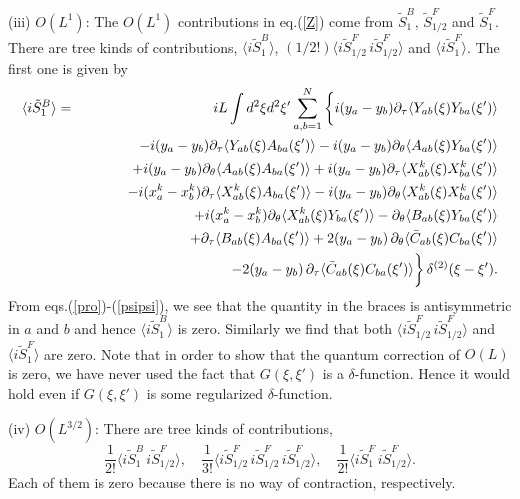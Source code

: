 \documentclass[a4paper,12pt]{article}
\newcommand{\nn}{\nonumber\\}
\newcommand{\ptau}{\partial_\tau}
\newcommand{\pth}{\partial_\theta}
\newcommand{\vev}[1]{\langle #1 \rangle}
\begin{document}
(iii) $O(L^{1})$:
The $O(L^{1})$ contributions in eq.(\ref{Z}) come from
$\tilde{S}_{1}^B$, $\tilde{S}_{1/2}^F$ and
$\tilde{S}_{1}^F$.
There are tree kinds of contributions,
$\vev{i\tilde{S}_{1}^B}$, $(1/2!) \vev{i\tilde{S}_{1/2}^F
\,i\tilde{S}_{1/2}^F}$ and $\vev{i\tilde{S}_{1}^F}$.
The first one is given by
\begin{eqnarray}
\vev{i\tilde{S}_{1}^B} &=&iL\int d^2 \xi d^2 \xi'
	 \sum_{a,b=1}^N\bigg\{i(y_a-y_b)\ptau
	\vev{Y_{ab}(\xi)Y_{ba}(\xi')}\nn
  &&\hspace{7ex}-i(y_a-y_b)\ptau\vev{Y_{ab}(\xi)A_{ba}(\xi')}
	-i(y_a-y_b)\pth\vev{A_{ab}(\xi)Y_{ba}(\xi')}\nn
  &&\hspace{7ex}+i(y_a-y_b)\pth\vev{A_{ab}(\xi)A_{ba}(\xi')}
	+i(y_a-y_b)\ptau\vev{X_{ab}^k(\xi)X_{ba}^k(\xi')}\nn
  &&\hspace{7ex}-i(x_a^k-x_b^k)\ptau\vev{X_{ab}^k(\xi)A_{ba}(\xi')}
	-i(y_a-y_b)\pth\vev{X_{ab}^k(\xi)X_{ba}^k(\xi')}\nn
  &&\hspace{7ex}+i(x_a^k-x_b^k)\pth\vev{X_{ab}^k(\xi)Y_{ba}(\xi')}
	  -\pth \vev{B_{ab}(\xi)Y_{ba}(\xi')}\nn
  &&\hspace{7ex}+\ptau\vev{B_{ab}(\xi)A_{ba}(\xi')}
	+2(y_a-y_b)\,\pth\vev{\bar{C}_{ab}(\xi)C_{ba}(\xi')}\nn
  &&\hspace{18ex}-2(y_a-y_b)\,\ptau
	\vev{\bar{C}_{ab}(\xi)C_{ba}(\xi')}\bigg\}
	\,\delta^{(2)}(\xi-\xi').
\end{eqnarray}
{}From eqs.(\ref{pro})-(\ref{psipsi}), we see that the quantity in the
braces is antisymmetric in $a$ and $b$ and hence
$\vev{i\tilde{S}_{1}^B}$ is zero. Similarly we find that
both $\vev{i\tilde{S}_{1/2}^F\,i\tilde{S}_{1/2}^F}$ and
$\vev{i\tilde{S}_{1}^F}$ are zero.
Note that in order to show that the quantum correction of $O(L)$ is
zero, we have never used the fact that $G(\xi,\xi')$
is a $\delta$-function.
Hence it would hold even if $G(\xi,\xi')$ is some
regularized $\delta$-function.

(iv) $O(L^{3/2})$:
There are tree kinds of contributions,
\[
 \frac{1}{2!}\vev{i\tilde{S}_{1}^B\,i\tilde{S}_{1/2}^F},\quad
  \frac{1}{3!}\vev{i\tilde{S}_{1/2}^F\,i\tilde{S}_{1/2}^F\,
	i\tilde{S}_{1/2}^F},\quad
  \frac{1}{2!}\vev{i\tilde{S}_{1}^F\,i\tilde{S}_{1/2}^F}.
\]
Each of them is zero because there is no way of
contraction, respectively.
\end{document}
